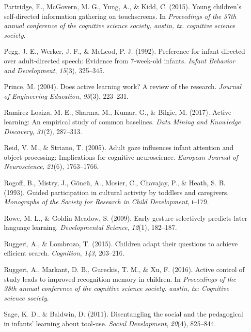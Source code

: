 \documentclass[a4paper,man,apacite,floatsintext]{apa6}
\begin{document}
\hypertarget{ref-partridge2015young}{}
Partridge, E., McGovern, M. G., Yung, A., \& Kidd, C. (2015). Young
children's self-directed information gathering on touchscreens. In
\emph{Proceedings of the 37th annual conference of the cognitive science
society, austin, tx. cognitive science society}.

\hypertarget{ref-pegg1992preference}{}
Pegg, J. E., Werker, J. F., \& McLeod, P. J. (1992). Preference for
infant-directed over adult-directed speech: Evidence from 7-week-old
infants. \emph{Infant Behavior and Development}, \emph{15}(3), 325--345.

\hypertarget{ref-prince2004does}{}
Prince, M. (2004). Does active learning work? A review of the research.
\emph{Journal of Engineering Education}, \emph{93}(3), 223--231.

\hypertarget{ref-ramirez2017active}{}
Ramirez-Loaiza, M. E., Sharma, M., Kumar, G., \& Bilgic, M. (2017).
Active learning: An empirical study of common baselines. \emph{Data
Mining and Knowledge Discovery}, \emph{31}(2), 287--313.

\hypertarget{ref-reid2005adult}{}
Reid, V. M., \& Striano, T. (2005). Adult gaze influences infant
attention and object processing: Implications for cognitive
neuroscience. \emph{European Journal of Neuroscience}, \emph{21}(6),
1763--1766.

\hypertarget{ref-rogoff1993guided}{}
Rogoff, B., Mistry, J., Göncü, A., Mosier, C., Chavajay, P., \& Heath,
S. B. (1993). Guided participation in cultural activity by toddlers and
caregivers. \emph{Monographs of the Society for Research in Child
Development}, i--179.

\hypertarget{ref-rowe2009early}{}
Rowe, M. L., \& Goldin-Meadow, S. (2009). Early gesture selectively
predicts later language learning. \emph{Developmental Science},
\emph{12}(1), 182--187.

\hypertarget{ref-ruggeri2015children}{}
Ruggeri, A., \& Lombrozo, T. (2015). Children adapt their questions to
achieve efficient search. \emph{Cognition}, \emph{143}, 203--216.

\hypertarget{ref-ruggeri2016active}{}
Ruggeri, A., Markant, D. B., Gureckis, T. M., \& Xu, F. (2016). Active
control of study leads to improved recognition memory in children. In
\emph{Proceedings of the 38th annual conference of the cognitive science
society. austin, tx: Cognitive science society}.

\hypertarget{ref-sage2011disentangling}{}
Sage, K. D., \& Baldwin, D. (2011). Disentangling the social and the
pedagogical in infants' learning about tool-use. \emph{Social
Development}, \emph{20}(4), 825--844.
\end{document}
